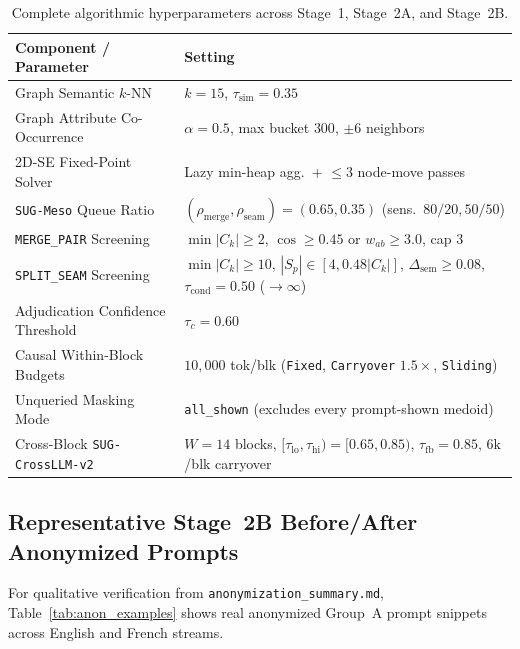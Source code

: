 \begin{table}[h]
\centering
\caption{Complete algorithmic hyperparameters across Stage~1, Stage~2A, and Stage~2B.}
\label{tab:ipm_params}
\small
\begin{tabular}{ll}
\toprule
\textbf{Component / Parameter} & \textbf{Setting} \\
\midrule
Graph Semantic $k$-NN & $k=15$, $\tau_{\text{sim}}=0.35$ \\
Graph Attribute Co-Occurrence & $\alpha=0.5$, max bucket $300$, $\pm 6$ neighbors \\
2D-SE Fixed-Point Solver & Lazy min-heap agg.\ + $\le 3$ node-move passes \\
\texttt{SUG-Meso} Queue Ratio & $(\rho_{\text{merge}}, \rho_{\text{seam}}) = (0.65, 0.35)$ (sens.\ $80/20, 50/50$) \\
\texttt{MERGE\_PAIR} Screening & $\min|C_k| \ge 2$, $\cos \ge 0.45$ or $w_{ab} \ge 3.0$, cap $3$ \\
\texttt{SPLIT\_SEAM} Screening & $\min|C_k| \ge 10$, $|S_p| \in [4, 0.48|C_k|]$, $\Delta_{\text{sem}} \ge 0.08$, $\tau_{\text{cond}}=0.50$ ($\to \infty$) \\
Adjudication Confidence Threshold & $\tau_c = 0.60$ \\
Causal Within-Block Budgets & $10{,}000$ tok/blk (\texttt{Fixed}, \texttt{Carryover} $1.5\times$, \texttt{Sliding}) \\
Unqueried Masking Mode & \texttt{all\_shown} (excludes every prompt-shown medoid) \\
Cross-Block \texttt{SUG-CrossLLM-v2} & $W=14$ blocks, $[\tau_{\text{lo}}, \tau_{\text{hi}}) = [0.65, 0.85)$, $\tau_{\text{fb}}=0.85$, $6\text{k}$/blk carryover \\
\bottomrule
\end{tabular}
\end{table}

\subsection{Representative Stage~2B Before/After Anonymized Prompts}
For qualitative verification from \texttt{anonymization\_summary.md}, Table~\ref{tab:anon_examples} shows real anonymized Group~A prompt snippets across English and French streams.

